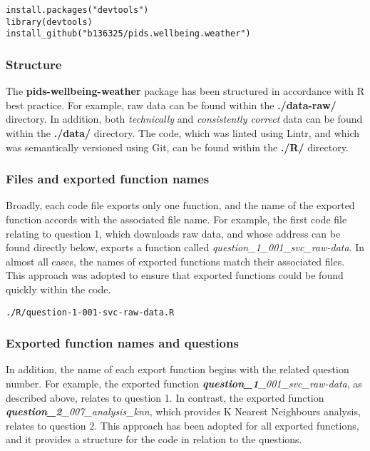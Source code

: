 \documentclass[12pt, oneside, openany]{book}
\begin{document}
\begin{verbatim}
install.packages("devtools")
library(devtools)
install_github("b136325/pids.wellbeing.weather")
\end{verbatim}

\subsubsection*{Structure}
The \textbf{pids-wellbeing-weather} package has been structured in accordance with R best practice\cite{rPackages}. For example, raw data can be found within the \textbf{./data-raw/} directory. In addition, both \emph{technically} and \emph{consistently correct} data can be found within the \textbf{./data/} directory. The code, which was linted using Lintr\cite{lintr}, and which was semantically versioned\cite{semvar} using Git\cite{git}, can be found within the \textbf{./R/} directory.

\subsubsection*{Files and exported function names}
Broadly, each code file exports only one function, and the name of the exported function accords with the associated file name. For example, the first code file relating to question 1, which downloads raw data, and whose address can be found directly below, exports a function called \emph{question\_1\_001\_svc\_raw-data}. In almost all cases, the names of exported functions match their associated files. This approach was adopted to ensure that exported functions could be found quickly within the code.

\begin{verbatim}
./R/question-1-001-svc-raw-data.R
\end{verbatim}

\subsubsection*{Exported function names and questions}
In addition, the name of each export function begins with the related question number. For example, the exported function \emph{\textbf{question\_1}\_001\_svc\_raw-data}, as described above, relates to question 1. In contrast, the exported function \emph{\textbf{question\_2}\_007\_analysis\_knn}, which provides K Nearest Neighbours analysis, relates to question 2. This approach has been adopted for all exported functions, and it provides a structure for the code in relation to the questions.
\end{document}

